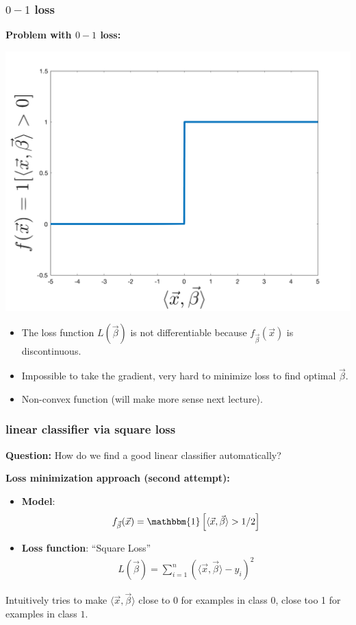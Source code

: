 \documentclass[handout,compress]{beamer}
\begin{document}
\begin{frame}
	\frametitle{$0-1$ loss}
	\textbf{Problem with $0-1$ loss:}
	\vspace{-.5em}
	\begin{center}
		\includegraphics[width=.5\textwidth]{sharp_function.png}
			\vspace{-.5em}
	\end{center}
\begin{itemize}
	\item The loss function $L(\vec{\beta})$ is not differentiable because $f_{\vec{\beta}}(\vec{x})$ is discontinuous.
	\item Impossible to take the gradient, very hard to minimize loss to find optimal $\vec{\beta}$.
	\item Non-convex function (will make more sense next lecture).
\end{itemize}
\end{frame}

\begin{frame}
	\frametitle{linear classifier via square loss}
	\textbf{Question:} How do we find a good linear classifier automatically?
	
	\textbf{Loss minimization approach (second attempt):}
	\begin{itemize}
		\item \textbf{Model}: 
		\begin{align*}
		f_{\vec{\beta}}(\vec{x}) = \mathbbm{1}\left[\langle \vec{x},\vec{\beta}\rangle > 1/2\right]
		\end{align*}
		\item \textbf{Loss function}: ``Square Loss''
		\begin{align*}
		L(\vec{\beta}) = \sum_{i=1}^n (\langle \vec{x},\vec{\beta}\rangle-y_i)^2
		\end{align*}
	\end{itemize}
Intuitively tries to make $\langle \vec{x},\vec{\beta}\rangle$ close to 0 for examples in class 0, close too 1 for examples in class $1$. 
\end{frame}
\end{document}

